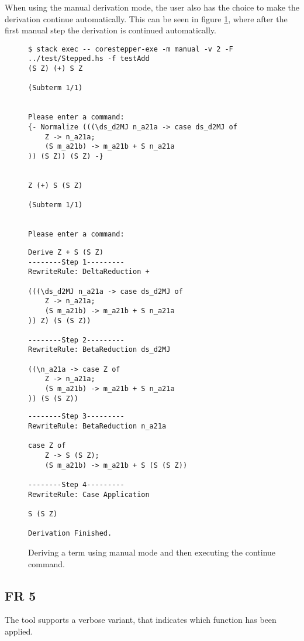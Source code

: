 \clearpage
When using the manual derivation mode,
the user also has the choice to make the derivation continue automatically.
This can be seen in figure \ref*{fig:FR4example2},
where after the first manual step the derivation is continued automatically.

\begin{figure}[!ht]
\begin{verbatim}
$ stack exec -- corestepper-exe -m manual -v 2 -F ../test/Stepped.hs -f testAdd
(S Z) (+) S Z

(Subterm 1/1)


Please enter a command:
{- Normalize (((\ds_d2MJ n_a21a -> case ds_d2MJ of
    Z -> n_a21a;
    (S m_a21b) -> m_a21b + S n_a21a
)) (S Z)) (S Z) -}


Z (+) S (S Z)

(Subterm 1/1)


Please enter a command:
\end{verbatim}
\end{figure}
\begin{figure}[!ht]
\begin{verbatim}
Derive Z + S (S Z)
--------Step 1---------
RewriteRule: DeltaReduction +

(((\ds_d2MJ n_a21a -> case ds_d2MJ of
    Z -> n_a21a;
    (S m_a21b) -> m_a21b + S n_a21a
)) Z) (S (S Z))

--------Step 2---------
RewriteRule: BetaReduction ds_d2MJ

((\n_a21a -> case Z of
    Z -> n_a21a;
    (S m_a21b) -> m_a21b + S n_a21a
)) (S (S Z))
\end{verbatim}
\end{figure}
\begin{figure}[!ht]
\begin{verbatim}
--------Step 3---------
RewriteRule: BetaReduction n_a21a

case Z of
    Z -> S (S Z);
    (S m_a21b) -> m_a21b + S (S (S Z))

--------Step 4---------
RewriteRule: Case Application

S (S Z)

Derivation Finished.
\end{verbatim}
    \caption{Deriving a term using manual mode and then executing the continue command.}
    \label{fig:FR4example2}
\end{figure}

\subsection{FR 5}
The tool supports a verbose variant, that indicates which function has been applied.

